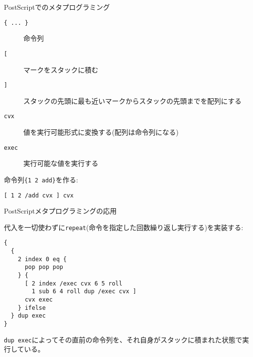\documentclass[cjk, 12pt]{beamer}
\begin{document}
\begin{frame}[fragile]{PostScriptでのメタプログラミング}

 \begin{description}
  \item[\texttt{\{ ... \}}] 命令列
  \item[\texttt{[}] マークをスタックに積む
  \item[\texttt{]}] スタックの先頭に最も近いマークからスタックの先頭までを配列にする
  \item[\texttt{cvx}] 値を実行可能形式に変換する(配列は命令列になる)
  \item[\texttt{exec}] 実行可能な値を実行する
 \end{description}

 命令列\texttt{\{1 2 add\}}を作る:

\begin{lstlisting}[style=postscript]
[ 1 2 /add cvx ] cvx
\end{lstlisting}

\end{frame}

\begin{frame}[fragile]{PostScriptメタプログラミングの応用}

 代入を一切使わずに\texttt{repeat}(命令を指定した回数繰り返し実行する)を実装する:

\begin{lstlisting}[style=postscript]
{
  {
    2 index 0 eq {
      pop pop pop
    } {
      [ 2 index /exec cvx 6 5 roll
        1 sub 6 4 roll dup /exec cvx ]
      cvx exec
    } ifelse
  } dup exec
}
\end{lstlisting}

 \texttt{dup exec}によってその直前の命令列を、それ自身がスタックに積まれた状態で実行している。

\end{frame}
\end{document}
